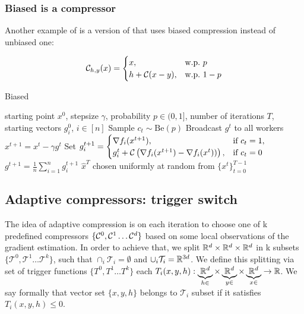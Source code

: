 \documentclass[nohyperref]{article}
\theoremstyle{plain}
\theoremstyle{definition}
\theoremstyle{remark}
\begin{document}
\subsubsection{Biased  is a  compressor}

Another example of  is a version of  that uses biased compression instead of unbiased one:

\begin{eqnarray}\label{eq:b_marina_compressor}
\mathcal{C}_{h,y}(x) = \begin{cases}x,& \text{w.p.\ } p\\ h + \mathcal{C}(x - y),& \text{w.p.\ } 1 - p \end{cases}
\end{eqnarray} 

\begin{algorithm}[!h]
   \caption{Biased }\label{alg:b_marina}
\begin{algorithmic}[1]
    starting point $x^0$, stepsize $\gamma$, probability $p\in(0,1]$, number of iterations $T$, starting vectors $g_i^0$, $i \in [n]$
   \STATE Sample $c_t \sim \text{Be}(p)$
   \STATE Broadcast $g^t$ to all workers
   \STATE $x^{t+1} = x^t - \gamma g^t$
   \STATE Set $g_i^{t+1} = \begin{cases}\nabla f_i(x^{t+1}), & \text{if } c_t = 1,\\ g_i^t + \mathcal{C}\left(\nabla f_{i}(x^{t+1}) - \nabla f_{i}(x^t))\right), & \text{if } c_t = 0\end{cases}$ 
   \ENDFOR
   \STATE $g^{t+1} = \tfrac{1}{n}\sum_{i=1}^ng_i^{t+1}$
   \ENDFOR
    $\hat x^T$ chosen uniformly at random from $\{x^t\}_{t=0}^{T-1}$
\end{algorithmic}
\end{algorithm}

\subsection{Adaptive  compressors: trigger switch}

The idea of adaptive compression is on each iteration to choose one of k predefined compressors $\{\mathcal{C}^0, \mathcal{C}^1 \ldots \mathcal{C}^d\}$ based on some local observations of the gradient estimation. In order to achieve that, we split $\mathbb R^d \times \mathbb R^d \times \mathbb R^d$ in k subsets $\{\mathcal{T}^0, \mathcal{T}^1 \ldots \mathcal{T}^k\}$, such that $\cap_i \mathcal{T}_i = \emptyset$ and $\cup_i \mathcal{T}_i = \mathbb R^{3d}$. We define this splitting via set of trigger functions $\{T^0, T^1 \ldots T^k\}$ each $T_i(x,y,h): \underbrace{\mathbb R^d}_{h\in} \times \underbrace{\mathbb R^d}_{y\in} \times \underbrace{\mathbb R^d}_{x\in} \rightarrow \mathbb R$. We say formally that vector set $\{x, y, h\}$ belongs to $\mathcal{T}_i$ subset if it satisfies $T_i(x,y,h) \leq 0$. 
\end{document}
